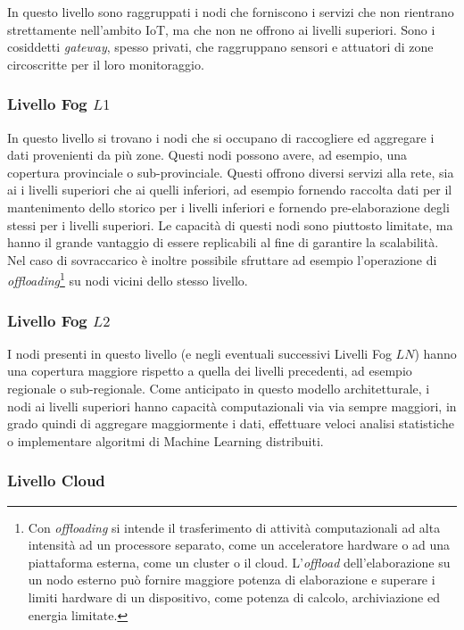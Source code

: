 In questo livello sono raggruppati i nodi che forniscono i servizi che non rientrano strettamente nell'ambito IoT, ma che non ne offrono ai livelli superiori. Sono i cosiddetti \textit{gateway}, spesso privati, che raggruppano sensori e attuatori di zone circoscritte per il loro monitoraggio.

\subsubsection{Livello Fog $L1$}

In questo livello si trovano i nodi che si occupano di raccogliere ed aggregare i dati provenienti da più zone. Questi nodi possono avere, ad esempio, una copertura provinciale o sub-provinciale. Questi offrono diversi servizi alla rete, sia ai i livelli superiori che ai quelli inferiori, ad esempio fornendo raccolta dati per il mantenimento dello storico per i livelli inferiori e fornendo pre-elaborazione degli stessi per i livelli superiori. Le capacità di questi nodi sono piuttosto limitate, ma hanno il grande vantaggio di essere replicabili al fine di garantire la scalabilità. Nel caso di sovraccarico è inoltre possibile sfruttare ad esempio l'operazione di \textit{offloading}\footnote{Con \textit{offloading} si intende il trasferimento di attività computazionali ad alta intensità ad un processore separato, come un acceleratore hardware o ad una piattaforma esterna, come un cluster o il cloud. L'\textit{offload} dell'elaborazione su un nodo esterno può fornire maggiore potenza di elaborazione e superare i limiti hardware di un dispositivo, come potenza di calcolo, archiviazione ed energia limitate.} su nodi vicini dello stesso livello.

\subsubsection{Livello Fog $L2$}
I nodi presenti in questo livello (e negli eventuali successivi Livelli Fog $LN$) hanno una copertura maggiore rispetto a quella dei livelli precedenti, ad esempio regionale o sub-regionale. Come anticipato in questo modello architetturale, i nodi ai livelli superiori hanno capacità computazionali via via sempre maggiori, in grado quindi di aggregare maggiormente i dati, effettuare veloci analisi statistiche o implementare algoritmi di Machine Learning distribuiti.

\subsubsection{Livello Cloud}

